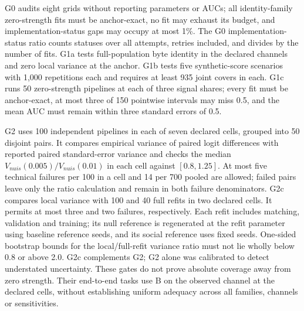 G0 audits eight grids without reporting parameters or AUCs; all identity-family zero-strength fits must be anchor-exact, no fit may exhaust its budget, and implementation-status gaps may occupy at most 1\%. The G0 implementation-status ratio counts statuses over all attempts, retries included, and divides by the number of fits. %
G1a tests full-population byte identity in the declared channels and zero local variance at the anchor. G1b tests five synthetic-score scenarios with 1,000 repetitions each and requires at least 935 joint covers in each. G1c runs 50 zero-strength pipelines at each of three signal shares; every fit must be anchor-exact, at most three of 150 pointwise intervals may miss 0.5, and the mean AUC must remain within three standard errors of 0.5. %

G2 uses 100 independent pipelines in each of seven declared cells, grouped into 50 disjoint pairs. It compares empirical variance of paired logit differences with reported paired standard-error variance and checks the median $V_{nuis}(0.005)/V_{nuis}(0.01)$ in each cell against $[0.8,1.25]$. At most five technical failures per 100 in a cell and 14 per 700 pooled are allowed; failed pairs leave only the ratio calculation and remain in both failure denominators. G2c compares local variance with 100 and 40 full refits in two declared cells. It permits at most three and two failures, respectively. Each refit includes matching, validation and training; its null reference is regenerated at the refit parameter using baseline reference seeds, and its social reference uses fixed seeds. One-sided bootstrap bounds for the local/full-refit variance ratio must not lie wholly below 0.8 or above 2.0. G2c complements G2; G2 alone was calibrated to detect understated uncertainty. These gates do not prove absolute coverage away from zero strength.
Their end-to-end tasks use B on the observed channel at the declared cells, without establishing uniform adequacy across all families, channels or sensitivities. %


